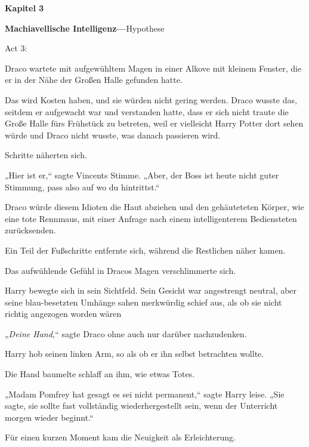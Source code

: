

\hypertarget{machiavellische-intelligenz-hypothese}{%

\textbf{Kapitel 3}

\textbf{Machiavellische Intelligenz—}Hypothese

Act 3:

Draco wartete mit aufgewühltem Magen in einer Alkove mit kleinem Fenster, die er in der Nähe der Großen Halle gefunden hatte.

Das wird Kosten haben, und sie würden nicht gering werden. Draco wusste das, seitdem er aufgewacht war und verstanden hatte, dass er sich nicht traute die Große Halle fürs Frühstück zu betreten, weil er vielleicht Harry Potter dort sehen würde und Draco nicht wusste, was danach passieren wird.

Schritte näherten sich.

„Hier ist er,“ sagte Vincents Stimme. „Aber, der Boss ist heute nicht guter Stimmung, pass also auf wo du hintrittst.“

Draco würde diesem Idioten die Haut abziehen und den gehäuteteten Körper, wie eine tote Rennmaus, mit einer Anfrage nach einem intelligenterem Bediensteten zurücksenden.

Ein Teil der Fußschritte entfernte sich, während die Restlichen näher kamen.

Das aufwühlende Gefühl in Dracos Magen verschlimmerte sich.

Harry bewegte sich in sein Sichtfeld. Sein Gesicht war angestrengt neutral, aber seine blau-besetzten Umhänge sahen merkwürdig schief aus, als ob sie nicht richtig angezogen worden wären \later

„\emph{Deine Hand,}“ sagte Draco ohne auch nur darüber nachzudenken.

Harry hob seinen linken Arm, so als ob er ihn selbst betrachten wollte.

Die Hand baumelte schlaff an ihm, wie etwas Totes.

„Madam Pomfrey hat gesagt es sei nicht permanent,“ sagte Harry leise. „Sie sagte, sie sollte fast vollständig wiederhergestellt sein, wenn der Unterricht morgen wieder beginnt.“

Für einen kurzen Moment kam die Neuigkeit als Erleichterung.

}

